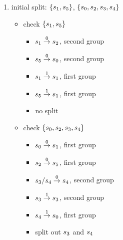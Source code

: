 \renewcommand{\labelitemii}{\ding{226}}
\begin{enumerate}
\item initial split: \(\{s_{1},s_{5}\}\), \(\{s_{0}, s_{2}, s_{3}, s_{4}\}\)
  \begin{itemize}
    \item check \(\{s_{1},s_{5}\}\)
      \begin{itemize}
      \item \(s_{1} \overset{0}{\rightarrow} s_{2}\), second group
      \item \(s_{5} \overset{0}{\rightarrow} s_{0}\), second group
      \item \(s_{1} \overset{1}{\rightarrow} s_{1}\), first group
      \item \(s_{5} \overset{1}{\rightarrow} s_{1}\), first group
      \item[] no split
    \end{itemize}

    \item check \(\{s_{0}, s_{2}, s_{3}, s_{4}\}\)
      \begin{itemize}
      \item \(s_{0} \overset{0}{\rightarrow} s_{1}\), first group
      \item \(s_{2} \overset{0}{\rightarrow} s_{5}\), first group
      \item \(s_{3}/s_{4} \overset{0}{\rightarrow} s_{4}\), second group
      \item \(s_{3} \overset{1}{\rightarrow} s_{3}\), second group
      \item \(s_{4} \overset{1}{\rightarrow} s_{0}\), first group
      \item[] split out \(s_{3}\) and \(s_{4}\)
    \end{itemize}
\end{itemize}


\end{enumerate}
